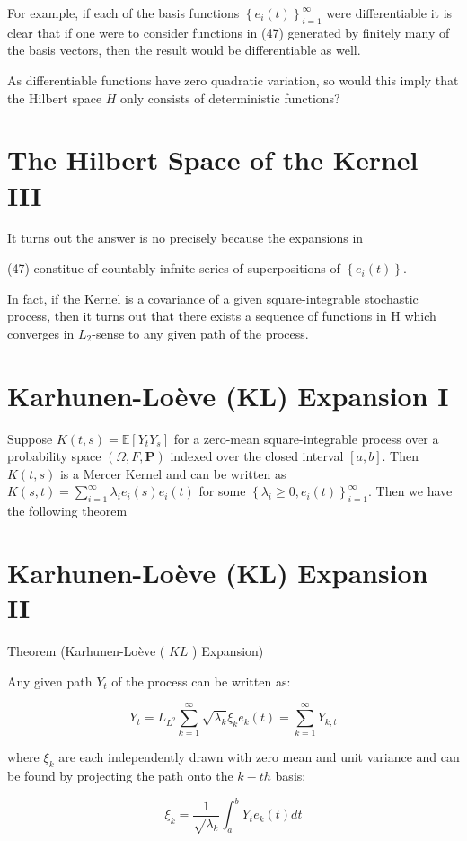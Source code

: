 \documentclass[11pt]{article}
\theoremstyle{plain} %
\theoremstyle{remark}
\begin{document}
For example, if each of the basis functions
$\left\{e_{i}(t)\right\}_{i=1}^{\infty}$ were differentiable it is clear that if
one were to consider functions in (47) generated by finitely many of the basis
vectors, then the result would be differentiable as well.

As differentiable functions have zero quadratic variation, so would this imply
that the Hilbert space $H$ only consists of deterministic functions?

\section*{The Hilbert Space of the Kernel III}
It turns out the answer is no precisely because the expansions in

(47) constitue of countably infnite series of superpositions of
$\left\{e_{i}(t)\right\}$.

In fact, if the Kernel is a covariance of a given square-integrable stochastic
process, then it turns out that there exists a sequence of functions in
$\mathrm{H}$ which converges in $L_{2}$-sense to any given path of the process.

\section*{Karhunen-Loève (KL) Expansion I}
Suppose $K(t, s)=\mathbb{E}\left[Y_{t} Y_{s}\right]$ for a zero-mean
square-integrable process over a probability space $(\Omega, F, \mathbf{P})$
indexed over the closed interval $[a, b]$. Then $K(t, s)$ is a Mercer Kernel and
can be written as $K(s, t)=\sum_{i=1}^{\infty} \lambda_{i} e_{i}(s) e_{i}(t)$
for some $\left\{\lambda_{i} \geq 0, e_{i}(t)\right\}_{i=1}^{\infty}$. Then we
have the following theorem

\section*{Karhunen-Loève (KL) Expansion II}
Theorem (Karhunen-Loève ( $K L$ ) Expansion)

Any given path $Y_{t}$ of the process can be written as:

$$
Y_{t}=L_{L^{2}} \sum_{k=1}^{\infty} \sqrt{\lambda_{k}} \xi_{k} e_{k}(t)=\sum_{k=1}^{\infty} Y_{k, t}
$$

where $\xi_{k}$ are each independently drawn with zero mean and unit variance
and can be found by projecting the path onto the $k-t h$ basis:

$$
\xi_{k}=\frac{1}{\sqrt{\lambda_{k}}} \int_{a}^{b} Y_{t} e_{k}(t) d t
$$
\end{document}
